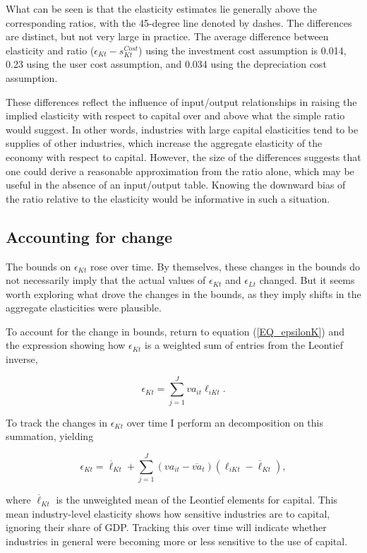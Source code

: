 \documentclass[11pt]{article}
\begin{document}
What can be seen is that the elasticity estimates lie generally above the corresponding ratios, with the 45-degree line denoted by dashes. The differences are distinct, but not very large in practice. The average difference between elasticity and ratio ($\epsilon_{Kt} - s^{Cost}_{Kt}$) using the investment cost assumption is 0.014, 0.23 using the user cost assumption, and 0.034 using the depreciation cost assumption. 

These differences reflect the influence of input/output relationships in raising the implied elasticity with respect to capital over and above what the simple ratio would suggest. In other words, industries with large capital elasticities tend to be supplies of other industries, which increase the aggregate elasticity of the economy with respect to capital. However, the size of the differences suggests that one could derive a reasonable approximation from the ratio alone, which may be useful in the absence of an input/output table. Knowing the downward bias of the ratio relative to the elasticity would be informative in such a situation.

\subsection{Accounting for change}
The bounds on $\epsilon_{Kt}$ rose over time. By themselves, these changes in the bounds do not necessarily imply that the actual values of $\epsilon_{Kt}$ and $\epsilon_{Lt}$ changed. But it seems worth exploring what drove the changes in the bounds, as they imply shifts in the aggregate elasticities were plausible.

To account for the change in bounds, return to equation (\ref{EQ_epsilonK}) and the expression showing how $\epsilon_{Kt}$ is a weighted sum of entries from the Leontief inverse,

\begin{equation}
	\epsilon_{Kt} = \sum_{j=1}^J va_{it} \ell_{iKt}. \nonumber
\end{equation}

To track the changes in $\epsilon_{Kt}$ over time I perform an \cite{op1996} decomposition on this summation, yielding

\begin{equation}
	\epsilon_{Kt} = \overline{\ell}_{Kt} + \sum_{j=1}^J (va_{it} - \overline{va}_{t})(\ell_{iKt}-\overline{\ell}_{Kt}), \label{EQ_op}
\end{equation}

where $\overline{\ell}_{Kt}$ is the unweighted mean of the Leontief elements for capital. This mean industry-level elasticity shows how sensitive industries are to capital, ignoring their share of GDP. Tracking this over time will indicate whether industries in general were becoming more or less sensitive to the use of capital.
\end{document}
